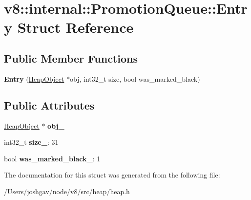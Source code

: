 \hypertarget{structv8_1_1internal_1_1_promotion_queue_1_1_entry}{}\section{v8\+:\+:internal\+:\+:Promotion\+Queue\+:\+:Entry Struct Reference}
\label{structv8_1_1internal_1_1_promotion_queue_1_1_entry}
\subsection*{Public Member Functions}
\begin{DoxyCompactItemize}
\item 
{\bfseries Entry} (\hyperlink{classv8_1_1internal_1_1_heap_object}{Heap\+Object} $\ast$obj, int32\+\_\+t size, bool was\+\_\+marked\+\_\+black)\hypertarget{structv8_1_1internal_1_1_promotion_queue_1_1_entry_af7996913d69abd07d6c6166f06ad9ee8}{}\label{structv8_1_1internal_1_1_promotion_queue_1_1_entry_af7996913d69abd07d6c6166f06ad9ee8}

\end{DoxyCompactItemize}
\subsection*{Public Attributes}
\begin{DoxyCompactItemize}
\item 
\hyperlink{classv8_1_1internal_1_1_heap_object}{Heap\+Object} $\ast$ {\bfseries obj\+\_\+}\hypertarget{structv8_1_1internal_1_1_promotion_queue_1_1_entry_a605e87a23c0ca18b269660305f260f41}{}\label{structv8_1_1internal_1_1_promotion_queue_1_1_entry_a605e87a23c0ca18b269660305f260f41}

\item 
int32\+\_\+t {\bfseries size\+\_\+}\+: 31\hypertarget{structv8_1_1internal_1_1_promotion_queue_1_1_entry_a781ea2f8b7c54e8c6e20c1503e61e859}{}\label{structv8_1_1internal_1_1_promotion_queue_1_1_entry_a781ea2f8b7c54e8c6e20c1503e61e859}

\item 
bool {\bfseries was\+\_\+marked\+\_\+black\+\_\+}\+: 1\hypertarget{structv8_1_1internal_1_1_promotion_queue_1_1_entry_a7590b18b3eb139a1dcdd1b7ef62e1de9}{}\label{structv8_1_1internal_1_1_promotion_queue_1_1_entry_a7590b18b3eb139a1dcdd1b7ef62e1de9}

\end{DoxyCompactItemize}


The documentation for this struct was generated from the following file\+:\begin{DoxyCompactItemize}
\item 
/\+Users/joshgav/node/v8/src/heap/heap.\+h\end{DoxyCompactItemize}
